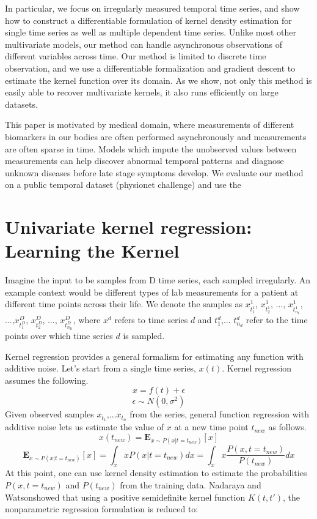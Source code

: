 \documentclass{article} %
\begin{document}
In particular, we focus on irregularly measured temporal time series, and show how to construct a differentiable formulation of kernel density estimation for single time series as well as multiple dependent time series. Unlike most other multivariate models, our method can handle asynchronous observations of different variables across time. Our method is limited to discrete time observation, and we use a differentiable formalization and gradient descent to estimate the kernel function over its domain. As we show, not only this method is easily able to recover multivariate kernels, it also runs efficiently on large datasets.  

This paper is motivated by medical domain, where measurements of different biomarkers in our bodies are often performed asynchronously and measurements are often sparse in time. Models which impute the unobserved values between measurements can help discover abnormal temporal patterns and diagnose unknown diseases before late stage symptoms develop. We evaluate our method on a public temporal dataset (physionet challenge) and use the 

\section{Univariate kernel regression: Learning the Kernel}
Imagine the input to be samples from D time series, each sampled irregularly. An example context would be different types of lab measurements for a patient at different time points across their life. We denote the samples as ${x^1_{t^1_1}}$, ${x^1_{t^1_2}}$, ..., ${x^1_{t^1_{n_1}}}$, ...,${x^D_{t^D_1}}$, ${x^D_{t^D_2}}$, ..., ${x^D_{t^D_{n_D}}}$, where $x^d$ refers to time series $d$ and $t^d_1$,... $t^d_{n_d}$ refer to the time points over which time series $d$ is sampled. 

Kernel regression provides a general formalism for estimating any function with additive noise. Let's start from a single time series, $x(t)$. Kernel regression assumes the following.
% 
$$ x = f(t) + \epsilon $$
$$\epsilon \sim N(0,\sigma^2)$$
% 
Given observed samples $x_{t_1}$,...$x_{t_n}$ from the series, general function regression with additive noise lets us estimate the value of $x$ at a new time point $t_{new}$ as follows. 
% 
$$x(t_{new}) = \mathbf{E}_{x \sim P(x|t=t_{new})}[x] $$
$$\mathbf{E}_{x \sim P(x|t=t_{new})}[x] = \int_x x P(x|t=t_{new}) dx =\int_x x \frac{P(x , t=t_{new})}{P(t_{new})} dx $$
% 
At this point, one can use kernel density estimation to estimate the probabilities $P(x , t=t_{new})$ and $P(t_{new})$ from the training data. Nadaraya\cite{} and Watson\cite{}showed that using a positive semidefinite kernel function $K(t, t')$, the nonparametric regression formulation is reduced to:
\end{document}
